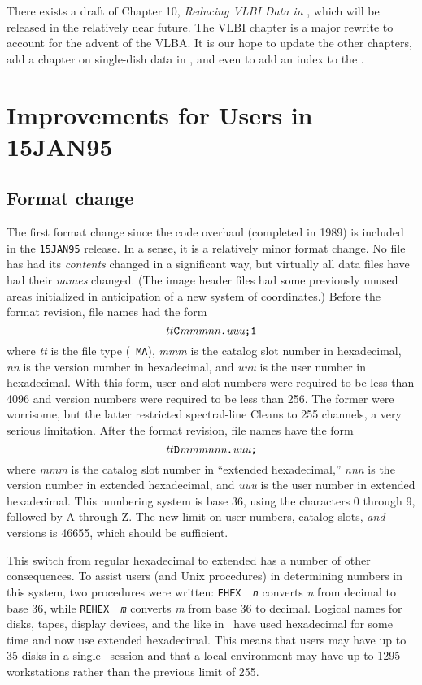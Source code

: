 \vspace{-8pt}
\noindent There exists a draft of Chapter 10, {\it Reducing VLBI Data
in \AIPS}, which will be released in the relatively near future.  The
VLBI chapter is a major rewrite to account for the advent of the
\hbox{VLBA}.  It is our hope to update the other chapters, add a
chapter on single-dish data in \AIPS, and even to add an index to the
\Cookbook.

\vfill
\eject

\section{Improvements for Users in 15JAN95}

\subsection{Format change}

The first format change since the code overhaul (completed in 1989) is
included in the {\tt 15JAN95} release.  In a sense, it is a relatively
minor format change.  No file has had its {\it contents} changed in a
significant way, but virtually all data files have had their {\it
names} changed.  (The image header files had some previously unused
areas initialized in anticipation of a new system of coordinates.)
Before the format revision, file names had the form
$$
     \hbox{{\it tt\/{\tt C}mmmnn{\tt .}uuu{\tt ;1}}}
$$
where {\it tt} is the file type (\eg\ {\tt MA}), {\it mmm} is the
catalog slot number in hexadecimal, {\it nn} is the version number in
hexadecimal, and {\it uuu} is the user number in hexadecimal.  With
this form, user and slot numbers were required to be less than 4096
and version numbers were required to be less than 256.  The former
were worrisome, but the latter restricted spectral-line Cleans to 255
channels, a very serious limitation.  After the format revision, file
names have the form
$$
     \hbox{{\it tt\/{\tt D}mmmnnn{\tt .}uuu{\tt ;}}}
$$
where {\it mmm} is the catalog slot number in ``extended
hexadecimal,'' {\it nnn} is the version number in extended
hexadecimal, and {\it uuu} is the user number in extended hexadecimal.
This numbering system is base 36, using the characters 0 through 9,
followed by A through \hbox{Z}.  The new limit on user numbers, catalog
slots, {\it and} versions is 46655, which should be sufficient.

This switch from regular hexadecimal to extended has a number of other
consequences.  To assist users (and Unix procedures) in determining
numbers in this system, two procedures were written: {\tt EHEX~{\it
n}} converts {\it n} from decimal to base 36, while {\tt REHEX~{\it
m}} converts {\it m} from base 36 to decimal.  Logical names for
disks, tapes, display devices, and the like in \AIPS\ have used
hexadecimal for some time and now use extended hexadecimal.  This
means that users may have up to 35 disks in a single \AIPS\ session
and that a local environment may have up to 1295 workstations rather
than the previous limit of 255.

